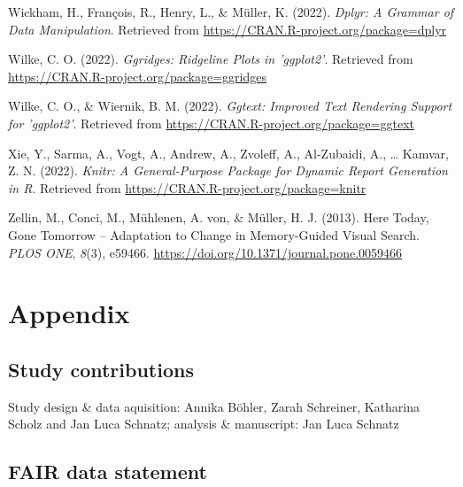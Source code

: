 \documentclass[
  man,floatsintext]{apa7}
\newlength{\cslhangindent}
\newlength{\cslentryspacingunit} %
\newenvironment{CSLReferences}[2] %
 {%
  \setlength{\parindent}{0pt}
  \ifodd #1
  \let\oldpar\par
  \def\par{\hangindent=\cslhangindent\oldpar}
  \fi
  \setlength{\parskip}{#2\cslentryspacingunit}
 }%
 {}
\begin{document}
\begin{CSLReferences}{1}{0}
\leavevmode{}%
Wickham, H., François, R., Henry, L., \& Müller, K. (2022). \emph{Dplyr: {A} {Grammar} of {Data} {Manipulation}}. Retrieved from \url{https://CRAN.R-project.org/package=dplyr}

\leavevmode{}%
Wilke, C. O. (2022). \emph{Ggridges: {Ridgeline} {Plots} in 'ggplot2'}. Retrieved from \url{https://CRAN.R-project.org/package=ggridges}

\leavevmode{}%
Wilke, C. O., \& Wiernik, B. M. (2022). \emph{Ggtext: {Improved} {Text} {Rendering} {Support} for 'ggplot2'}. Retrieved from \url{https://CRAN.R-project.org/package=ggtext}

\leavevmode{}%
Xie, Y., Sarma, A., Vogt, A., Andrew, A., Zvoleff, A., Al-Zubaidi, A., \ldots{} Kamvar, Z. N. (2022). \emph{Knitr: {A} {General}-{Purpose} {Package} for {Dynamic} {Report} {Generation} in {R}}. Retrieved from \url{https://CRAN.R-project.org/package=knitr}

\leavevmode{}%
Zellin, M., Conci, M., Mühlenen, A. von, \& Müller, H. J. (2013). Here {Today}, {Gone} {Tomorrow} -- {Adaptation} to {Change} in {Memory}-{Guided} {Visual} {Search}. \emph{PLOS ONE}, \emph{8}(3), e59466. \url{https://doi.org/10.1371/journal.pone.0059466}

\end{CSLReferences}

\newpage

\hypertarget{appendix}{%
\section{Appendix}\label{appendix}}

\hypertarget{study-contributions}{%
\subsection{Study contributions}\label{study-contributions}}

\noindent Study design \& data aquisition: Annika Böhler, Zarah Schreiner, Katharina Scholz and Jan Luca Schnatz; analysis \& manuscript: Jan Luca Schnatz

\hypertarget{fair-data-statement}{%
\subsection{FAIR data statement}\label{fair-data-statement}}
\end{document}
